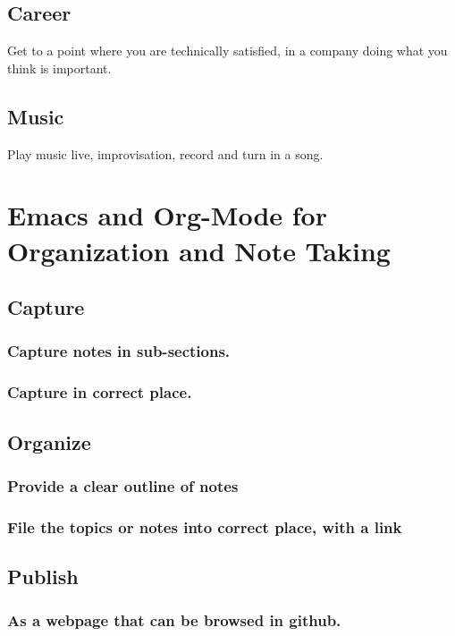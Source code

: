 \documentclass[11pt]{article}
\begin{document}
\subsection{Career}
\label{sec:orgb344a07}
Get to a point where you are technically satisfied, in a company
doing what you think is important.
\subsection{Music}
\label{sec:orga8943f0}
Play music live, improvisation, record and turn in a song. 


\section{Emacs and Org-Mode for Organization and Note Taking}
\label{sec:orga38c465}
\subsection{Capture}
\label{sec:org9c35493}
\subsubsection{Capture notes in sub-sections.}
\label{sec:org42de4d6}
\subsubsection{Capture in correct place.}
\label{sec:org77a37b6}
\subsection{Organize}
\label{sec:org0fbd7c7}
\subsubsection{Provide a clear outline of notes}
\label{sec:org57c94a8}
\subsubsection{File the topics or notes into correct place, with a link}
\label{sec:orgdd8ad02}
\subsection{Publish}
\label{sec:org76327a0}
\subsubsection{As a webpage that can be browsed in github.}
\label{sec:org6d9707b}
\end{document}
